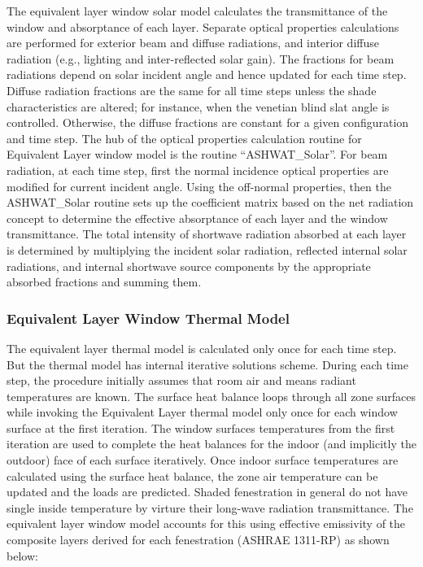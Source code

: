 The equivalent layer window solar model calculates the transmittance of the window and absorptance of each layer. Separate optical properties calculations are performed for exterior beam and diffuse radiations, and interior diffuse radiation (e.g., lighting and inter-reflected solar gain). The fractions for beam radiations depend on solar incident angle and hence updated for each time step. Diffuse radiation fractions are the same for all time steps unless the shade characteristics are altered; for instance, when the venetian blind slat angle is controlled. Otherwise, the diffuse fractions are constant for a given configuration and time step. The hub of the optical properties calculation routine for Equivalent Layer window model is the routine ``ASHWAT\_Solar''. For beam radiation, at each time step, first the normal incidence optical properties are modified for current incident angle. Using the off-normal properties, then the ASHWAT\_Solar routine sets up the coefficient matrix based on the net radiation concept to determine the effective absorptance of each layer and the window transmittance. The total intensity of shortwave radiation absorbed at each layer is determined by multiplying the incident solar radiation, reflected internal solar radiations, and internal shortwave source components by the appropriate absorbed fractions and summing them.

\subsubsection{Equivalent Layer Window Thermal Model}\label{equivalent-layer-window-thermal-model}

The equivalent layer thermal model is calculated only once for each time step. But the thermal model has internal iterative solutions scheme. During each time step, the procedure initially assumes that room air and means radiant temperatures are known. The surface heat balance loops through all zone surfaces while invoking the Equivalent Layer thermal model only once for each window surface at the first iteration. The window surfaces temperatures from the first iteration are used to complete the heat balances for the indoor (and implicitly the outdoor) face of each surface iteratively. Once indoor surface temperatures are calculated using the surface heat balance, the zone air temperature can be updated and the loads are predicted. Shaded fenestration in general do not have single inside temperature by virture their long-wave radiation transmittance. The equivalent layer window model accounts for this using effective emissivity of the composite layers derived for each fenestration (ASHRAE 1311-RP) as shown below:

